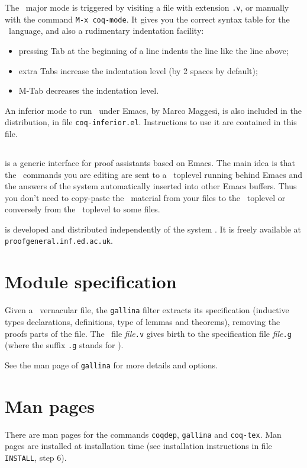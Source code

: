 The \Coq\ major mode is triggered by visiting a file with extension {\tt .v},
or manually with the command \verb!M-x coq-mode!.
It gives you the correct syntax table for
the \Coq\ language, and also a rudimentary indentation facility:
\begin{itemize}
  \item pressing {\sc Tab} at the beginning of a line indents the line like
    the line above;

  \item extra {\sc Tab}s increase the indentation level
    (by 2 spaces by default);

  \item M-{\sc Tab} decreases the indentation level.
\end{itemize}

An inferior mode to run \Coq\ under Emacs, by Marco Maggesi, is also
included in the distribution, in file \texttt{coq-inferior.el}.
Instructions to use it are contained in this file.

\subsection[{\ProofGeneral}]{{\ProofGeneral}}

{\ProofGeneral} is a generic interface for proof assistants based on
Emacs. The main idea is that the \Coq\ commands you are
editing are sent to a \Coq\ toplevel running behind Emacs and the
answers of the system automatically inserted into other Emacs buffers.
Thus you don't need to copy-paste the \Coq\ material from your files
to the \Coq\ toplevel or conversely from the \Coq\ toplevel to some
files.

{\ProofGeneral} is developed and distributed independently of the
system \Coq. It is freely available at \verb!proofgeneral.inf.ed.ac.uk!.


\section[Module specification]{Module specification\label{gallina}}

Given a \Coq\ vernacular file, the {\tt gallina} filter extracts its
specification (inductive types declarations, definitions, type of
lemmas and theorems), removing the proofs parts of the file. The \Coq\
file {\em file}{\tt.v} gives birth to the specification file
{\em file}{\tt.g} (where the suffix {\tt.g} stands for \gallina).

See the man page of {\tt gallina} for more details and options.


\section[Man pages]{Man pages\label{ManPages}}

There are man pages for the commands {\tt coqdep}, {\tt gallina} and
{\tt coq-tex}. Man pages are installed at installation time
(see installation instructions in file {\tt INSTALL}, step 6).


